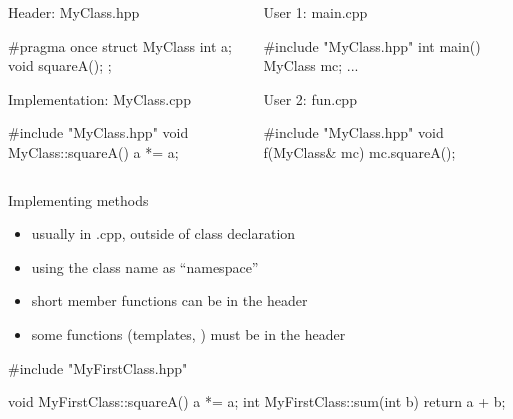 \begin{frame}[fragile]
  \begin{columns}[t]
    \begin{column}{.45\textwidth}
    \begin{block}{Header: MyClass.hpp}
      \begin{cppcode*}{}
        #pragma once
        struct MyClass {
          int a;
          void squareA();
        };
      \end{cppcode*}
    \end{block}
    \begin{block}{Implementation: MyClass.cpp}
      \begin{cppcode*}{}
        #include "MyClass.hpp"
        void MyClass::squareA() {
          a *= a;
        }
      \end{cppcode*}
    \end{block}
    \end{column}
    \begin{column}{.45\textwidth}
    \begin{block}{User 1: main.cpp}
      \begin{cppcode*}{}
        #include "MyClass.hpp"
        int main() {
          MyClass mc;
          ...
        }
      \end{cppcode*}
    \end{block}
    \begin{block}{User 2: fun.cpp}
      \begin{cppcode*}{}
        #include "MyClass.hpp"
        void f(MyClass& mc) {
          mc.squareA();
        }
      \end{cppcode*}
    \end{block}
    \end{column}
  \end{columns}
\end{frame}

\begin{frame}[fragile]
  \begin{goodpractice}{Implementing methods}
    \begin{itemize}
    \item usually in .cpp, outside of class declaration
    \item using the class name as ``namespace''
    \item short member functions can be in the header
    \item some functions (templates, ) must be in the header
    \end{itemize}
  \end{goodpractice}
  \begin{block}{}
    \begin{cppcode}
    #include "MyFirstClass.hpp"

    void MyFirstClass::squareA() {
      a *= a;
    }
    int MyFirstClass::sum(int b) {
      return a + b;
    }
    \end{cppcode}
  \end{block}
\end{frame}

